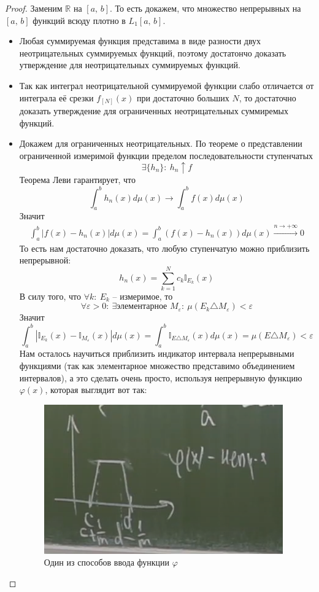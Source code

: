\documentclass[a4paper,12pt]{article}
\renewcommand{\phi}{\ensuremath{\varphi}}
\theoremstyle{plain}
\theoremstyle{definition}
\theoremstyle{remark}
\begin{document}
\begin{proof}
	Заменим $\mathbb{R}$ на $[a,\,b]$. То есть докажем, что множество непрерывных на $[a,\,b]$ функций всюду плотно в $L_1[a,\,b]$.

	\begin{itemize}
		\item Любая суммируемая функция представима в виде разности двух неотрицательных суммируемых функций, поэтому достатончо доказать утверждение для
		      неотрицательных суммируемых функций.
		\item Так как интеграл неотрицательной суммируемой функции слабо отличается от интеграла её срезки $f_{[N]}(x)$ при достаточно больших $N$, то
		      достаточно доказать утверждение для ограниченных неотрицательных суммиремых функций.
		\item Докажем для ограниченных неотрицательных. По теореме о представлении ограниченной измеримой функции пределом последовательности ступенчатых
		      \[\exists \{h_n\}:\: h_n \uparrow f\]
		      Теорема Леви гарантирует, что
		      \[\int_a^b h_n(x)d\mu(x) \to \int_a^b f(x)d\mu(x)\]
		      Значит
		      \begin{align*}
			      \int_a^b |f(x) - h_n(x)|d\mu(x) = \int_a^b (f(x) - h_n(x))d\mu(x) \stackrel{n \to +\infty}{\to} 0
		      \end{align*}
		      То есть нам достаточно доказать, что любую ступенчатую можно приблизить непрерывной:
		      \[h_n(x) = \sum_{k = 1}^N c_k \mathbb{I}_{E_k}(x)\]
		      В силу того, что $\forall k:\: E_k$ -- измеримое, то
		      \[\forall \varepsilon > 0:\: \exists \text{элементарное } M_\varepsilon:\: \mu(E_k \triangle M_\varepsilon) < \varepsilon \]
		      Значит
		      \[\int_a^b |\mathbb{I}_{E_k}(x) - \mathbb{I}_{M_\varepsilon}(x)|d\mu(x) = \int_a^b \mathbb{I}_{E \triangle M_\varepsilon}(x)d\mu(x) = \mu(E \triangle M_\varepsilon) < \varepsilon\]
		      Нам осталось научиться приблизить индикатор интервала непрерывными функциями (так как элементарное множество представимо объединением интервалов), а это сделать очень просто, используя непрерывную функцию $\phi(x)$, которая выглядит вот так:
		      \begin{figure}[h]
			      \includegraphics[scale=0.5]{img/phi_graph.png}
			      \caption{Один из способов ввода функции $\phi$}
		      \end{figure}
					

\end{itemize}
\end{proof}
\end{document}
